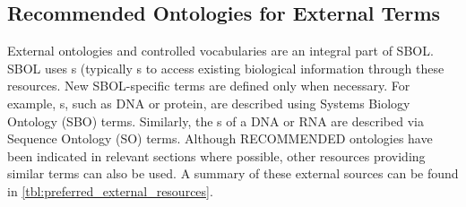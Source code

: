 \subsection{Recommended Ontologies for External Terms}
\label{sec:recomm_ontologies}

External ontologies and controlled vocabularies are an integral part of SBOL. SBOL uses s (typically s to access existing biological information through these resources. 
New SBOL-specific terms are defined only when necessary. 
For example,  s, such as DNA or protein, are described using Systems Biology Ontology (SBO) terms. Similarly, the s of a DNA or RNA  are described via Sequence Ontology (SO) terms. Although RECOMMENDED ontologies have been indicated in relevant sections where possible, other resources providing similar terms can also be used. A summary of these external sources can be found in \ref{tbl:preferred_external_resources}.

